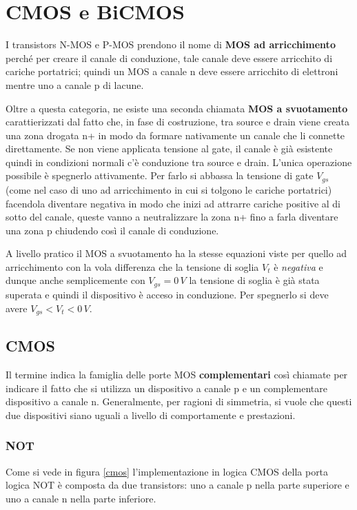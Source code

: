 \documentclass[12pt, a4paper]{report}
\begin{document}
\chapter{CMOS e BiCMOS}
I transistors N-MOS e P-MOS prendono il nome di \textbf{MOS ad arricchimento} perché per creare il canale di conduzione, tale canale deve essere arricchito di cariche portatrici; quindi un MOS a canale n deve essere arricchito di elettroni mentre uno a canale p di lacune.

Oltre a questa categoria, ne esiste una seconda chiamata \textbf{MOS a svuotamento} carattierizzati dal fatto che, in fase di costruzione, tra source e drain viene creata una zona drogata n+ in modo da formare nativamente un canale che li connette direttamente. Se non viene applicata tensione al gate, il canale è già esistente quindi in condizioni normali c'è conduzione tra source e drain. L'unica operazione possibile è spegnerlo attivamente. Per farlo si abbassa la tensione di gate $V_{gs}$ (come nel caso di uno ad arricchimento in cui si tolgono le cariche portatrici) facendola diventare negativa in modo che inizi ad attrarre cariche positive al di sotto del canale, queste vanno a neutralizzare la zona n+ fino a farla diventare una zona p chiudendo così il canale di conduzione.

A livello pratico il MOS a svuotamento ha la stesse equazioni viste per quello ad arricchimento con la vola differenza che la tensione di soglia $V_t$ è \textit{negativa} e dunque anche semplicemente con $V_{gs} = 0\,V$ la tensione di soglia è già stata superata e quindi il dispositivo è acceso in conduzione. Per spegnerlo si deve avere $V_{gs} < V_{t} < 0\,V$.

\section{CMOS}
Il termine indica la famiglia delle porte MOS \textbf{complementari} così chiamate per indicare il fatto che si utilizza un dispositivo a canale p e un complementare dispositivo a canale n. Generalmente, per ragioni di simmetria, si vuole che questi due dispositivi siano uguali a livello di comportamente e prestazioni.

\subsection{NOT}
Come si vede in figura \ref{cmos} l'implementazione in logica CMOS della porta logica NOT è composta da due transistors: uno a canale p nella parte superiore e uno a canale n nella parte inferiore.
\end{document}
